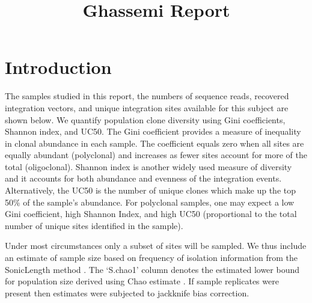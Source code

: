 \documentclass[]{article}
\title{Ghassemi Report }
\author{}
\date{}
\begin{document}
	
%    


{%
\setlength{\parindent}{0pt}
\thispagestyle{plain}
{\fontsize{18}{20}\selectfont\raggedright 
\maketitle  %

}

{
   \vskip 13.5pt\relax \normalsize\fontsize{11}{12} 
 

}

}






\vskip 6.5pt


\noindent  \hypertarget{introduction}{%
\section{Introduction}\label{introduction}}

The samples studied in this report, the numbers of sequence reads,
recovered integration vectors, and unique integration sites available
for this subject are shown below. We quantify population clone diversity
using Gini coefficients, Shannon index, and UC50. The Gini coefficient
provides a measure of inequality in clonal abundance in each sample. The
coefficient equals zero when all sites are equally abundant (polyclonal)
and increases as fewer sites account for more of the total
(oligoclonal). Shannon index is another widely used measure of diversity
and it accounts for both abundance and evenness of the integration
events. Alternatively, the UC50 is the number of unique clones which
make up the top 50\% of the sample's abundance. For polyclonal samples,
one may expect a low Gini coefficient, high Shannon Index, and high UC50
(proportional to the total number of unique sites identified in the
sample).

Under most circumstances only a subset of sites will be sampled. We thus
include an estimate of sample size based on frequency of isolation
information from the SonicLength method \citet{berry2012}. The `S.chao1'
column denotes the estimated lower bound for population size derived
using Chao estimate \citet{chao1987}. If sample replicates were present
then estimates were subjected to jackknife bias correction.
\end{document}
